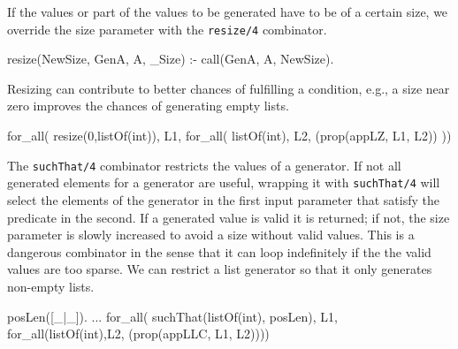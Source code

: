 \documentclass[runningheads,a4paper]{../../PaperStyles/llncs}
\newcommand{\yap}[1]{\lstinline[style=yap]{#1}}
\begin{document}


If the values or part of the values to be generated have to be of a
certain size, we override the size parameter with the \yap{resize/4}
combinator.
%
\begin{yapcode}
 resize(NewSize, GenA, A, _Size) :- call(GenA, A, NewSize).
\end{yapcode}
%
Resizing can contribute to better chances of fulfilling a condition,
e.g., a size near zero improves the chances of generating empty lists.
%
\begin{yapcode}
 for_all(  resize(0,listOf(int)),  L1,
   for_all( listOf(int), L2, (prop({appLZ, L1, L2})) ))
\end{yapcode}


The \yap{suchThat/4} combinator restricts the values of a generator.
%
If not all generated elements for a generator are useful, wrapping it
with \yap{suchThat/4} will select the elements of the generator in the
first input parameter that satisfy the predicate in the second.
%
If a generated value is valid it is returned; if not, the size parameter is
slowly increased to avoid a size without valid values.
%
This is a dangerous combinator in the sense that it can loop
indefinitely  if the the valid values are too sparse.
%
We can restrict a list generator so that it only generates non-empty
lists.
%
\begin{yapcode}
 posLen([_|_]).
 ...
   for_all(  suchThat(listOf(int), posLen),  L1,
     for_all(listOf(int),L2, (prop({appLLC, L1, L2}))))
\end{yapcode}
\end{document}
